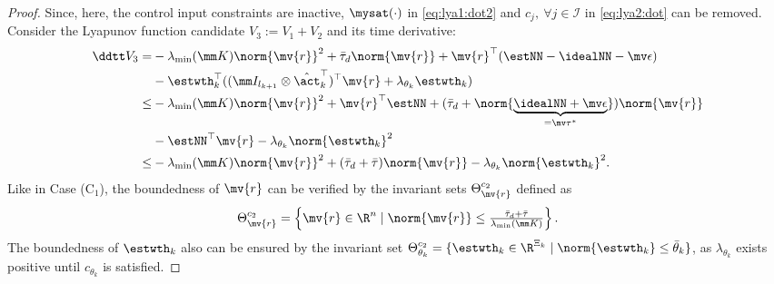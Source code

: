\documentclass[lettersize,journal]{IEEEtran}
\newcommand*{\fe}{\mv{r}}
\begin{document}
\begin{proof}
Since, here, the control input constraints are inactive, $\mysat(\cdot)$ in \eqref{eq:lya1:dot2} and $c_j,\ \forall j\in\mathcal{I}$ in \eqref{eq:lya2:dot} can be removed.
Consider the Lyapunov function candidate $V_3:=V_1+V_2$ and its time derivative:
\begin{equation}
    \begin{aligned}
        \ddtt V_3
        =&
        -\lambda_{\text{min}}(\mm K)\norm{\fe}^2
        +\bar\tau_d\norm{\fe}
        +\fe^\top (\estNN - \idealNN - \mv\epsilon)
        \\
        &
        -\estwth_k^\top (
            (\mm I_{l_{k+1}}\otimes \hat\act_k^\top)^\top
            \fe
            +
            \lambda_{\theta_k}\estwth_k
        )
        \\
        \le&
        -\lambda_{\text{min}}(\mm K)\norm{\fe}^2
        +\fe^\top \estNN
        +(
            \bar\tau_d+\norm{
                \underbrace{
                    \idealNN+\mv\epsilon
                }_{=\mv\tau^*}
            }
        )
        \norm{\fe}
        \\
        &
        -\estNN^\top\fe 
        -\lambda_{\theta_k}\norm{\estwth_k}^2
        \\
        \le&
        -\lambda_{\text{min}}(\mm K)\norm{\fe}^2
        +(\bar\tau_d+\bar\tau)
        \norm{\fe}
        -\lambda_{\theta_k}\norm{\estwth_k}^2
        .
    \end{aligned}
    \label{eq:lya3:dot}
\end{equation}
Like in Case (C$_1$), the boundedness of $\fe$ can be verified by the invariant sets $\Theta_{\fe}^{c_2}$ defined as
\begin{equation}
    \Theta_{\fe}^{c_2}
    =
    \left\{ 
        \fe \in \R^n 
        \mid 
        \norm{\fe} 
        \le 
        \tfrac{
            \bar\tau_d+\bar\tau
        }{
            \lambda_{\text{min}}(\mm K)
        }
    \right\}
    .
\end{equation}
The boundedness of $\estwth_k$ also can be ensured by the invariant set $\Theta_{\theta_k}^{c_2}=\{ \estwth_k \in \R^{\Xi_{k}} \mid \norm{\estwth_k} \le \bar\theta_k \}$, as $\lambda_{\theta_k}$ exists positive until $c_{\theta_k}$ is satisfied.

\hfill 


\end{proof}
\end{document}
